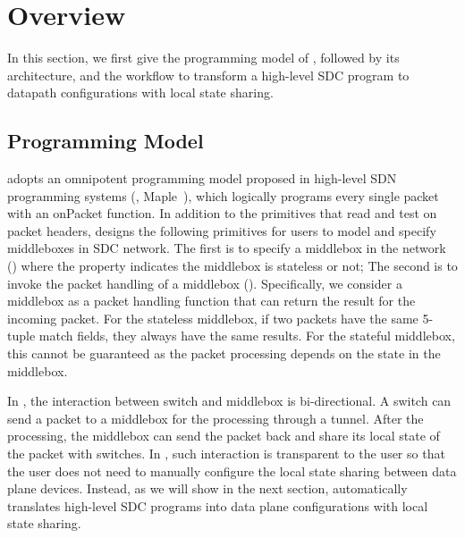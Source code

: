 \section{\concept{} Overview} \label{sec:system}
In this section, we first give the programming model of \concept{}, followed by
its architecture, and the workflow to transform a high-level SDC program to
datapath configurations with local state sharing.


\vspace{-2mm}
\subsection{Programming Model}
\concept{} adopts an omnipotent programming model proposed in high-level SDN
programming systems (\eg, Maple~\cite{maple}), which logically programs every single packet with an
onPacket function. In addition to the primitives that read and test on packet
headers, \concept{} designs the following primitives for users to model and
specify middleboxes in SDC network. The first is to specify a middlebox in the network () where the property indicates the middlebox is stateless or not; The
second is to
invoke the packet handling of a middlebox ().
Specifically, we consider a middlebox as a packet handling function that can
return the result for the incoming packet. For the stateless middlebox, if two
packets have the same 5-tuple match fields, they always have the same
results. For the stateful middlebox, this cannot be guaranteed as the packet
processing depends on the state in the middlebox.

In \concept{}, the interaction between switch and middlebox is bi-directional.
A switch can send a packet to a
middlebox for the processing through a tunnel. After the processing, the middlebox can send
the packet back and share its local state of the packet %
with switches. In \concept{}, such interaction is transparent to the user so that
the user does not need to manually configure the local state sharing between
data plane devices. Instead, as we will show in the next section, \concept{}
automatically translates high-level SDC programs into data plane configurations
with local state sharing.

